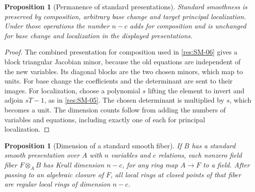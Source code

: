 \documentclass[11pt,oneside,openany]{book}
\newtheorem{proposition}[theorem]{Proposition}
\theoremstyle{definition}
\theoremstyle{remark}
\begin{document}
\begin{proposition}[Permanence of standard presentations]
\label{res:SM-11}
Standard smoothness is preserved by composition, arbitrary
base change and target principal localization. Under those
operations the number $n-c$ adds for composition and is
unchanged for base change and localization in the displayed
presentations.
\end{proposition}

\begin{proof}
The combined presentation for composition used in
\ref{res:SM-06} gives a block triangular Jacobian minor,
because the old equations are independent of the new variables.
Its diagonal blocks are the two chosen minors, which map to
units. For base change the coefficients and the determinant are
sent to their images. For localization, choose a polynomial
$s$ lifting the element to invert and adjoin $sT-1$, as in
\ref{res:SM-05}. The chosen determinant is multiplied by $s$,
which becomes a unit. The dimension counts follow from adding
the numbers of variables and equations, including exactly one
of each for principal localization.
\end{proof}

\begin{proposition}[Dimension of a standard smooth fiber]
\label{res:SM-12}
If $B$ has a standard smooth presentation over $A$ with
$n$ variables and $c$ relations, each nonzero field fiber
$F\otimes_A B$ has Krull dimension $n-c$, for any ring map
$A\to F$ to a field. After passing to an algebraic closure of
$F$, all local rings at closed points of that fiber are
regular local rings of dimension $n-c$.
\end{proposition}
\end{document}
